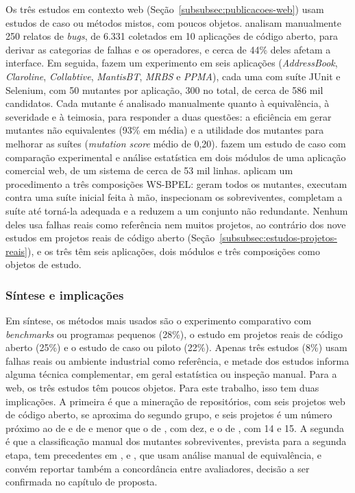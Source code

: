 Os três estudos em contexto web (Seção~\ref{subsubsec:publicacoes-web}) usam estudos de caso ou métodos mistos, com poucos objetos.  analisam manualmente 250 relatos de \textit{bugs}, de 6.331 coletados em 10 aplicações de código aberto, para derivar as categorias de falhas e os operadores, e cerca de 44\% deles afetam a interface. Em seguida, fazem um experimento em seis aplicações (\textit{AddressBook}, \textit{Claroline}, \textit{Collabtive}, \textit{MantisBT}, \textit{MRBS} e \textit{PPMA}), cada uma com suíte JUnit e Selenium, com 50 mutantes por aplicação, 300 no total, de cerca de 586 mil candidatos. Cada mutante é analisado manualmente quanto à equivalência, à severidade e à teimosia, para responder a duas questões: a eficiência em gerar mutantes não equivalentes (93\% em média) e a utilidade dos mutantes para melhorar as suítes (\textit{mutation score} médio de 0,20).  fazem um estudo de caso com comparação experimental e análise estatística em dois módulos de uma aplicação comercial web, de um sistema de cerca de 53 mil linhas.  aplicam um procedimento a três composições WS-BPEL: geram todos os mutantes, executam contra uma suíte inicial feita à mão, inspecionam os sobreviventes, completam a suíte até torná-la adequada e a reduzem a um conjunto não redundante. Nenhum deles usa falhas reais como referência nem muitos projetos, ao contrário dos nove estudos em projetos reais de código aberto (Seção~\ref{subsubsec:estudos-projetos-reais}), e os três têm seis aplicações, dois módulos e três composições como objetos de estudo.

\subsubsection{Síntese e implicações}
\label{subsubsec:sintese-validacao}

Em síntese, os métodos mais usados são o experimento comparativo com \textit{benchmarks} ou programas pequenos (28\%), o estudo em projetos reais de código aberto (25\%) e o estudo de caso ou piloto (22\%). Apenas três estudos (8\%) usam falhas reais ou ambiente industrial como referência, e metade dos estudos informa alguma técnica complementar, em geral estatística ou inspeção manual. Para a web, os três estudos têm poucos objetos. Para este trabalho, isso tem duas implicações. A primeira é que a mineração de repositórios, com seis projetos web de código aberto, se aproxima do segundo grupo, e seis projetos é um número próximo ao de  e de  e menor que o de , com dez, e o de , com 14 e 15. A segunda é que a classificação manual dos mutantes sobreviventes, prevista para a segunda etapa, tem precedentes em ,  e , que usam análise manual de equivalência, e convém reportar também a concordância entre avaliadores, decisão a ser confirmada no capítulo de proposta.

